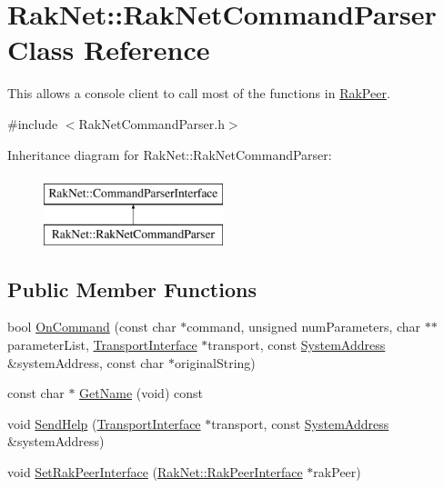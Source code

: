 \hypertarget{class_rak_net_1_1_rak_net_command_parser}{\section{Rak\-Net\-:\-:Rak\-Net\-Command\-Parser Class Reference}
\label{class_rak_net_1_1_rak_net_command_parser}
}


This allows a console client to call most of the functions in \hyperlink{class_rak_net_1_1_rak_peer}{Rak\-Peer}.  




{\ttfamily \#include $<$Rak\-Net\-Command\-Parser.\-h$>$}

Inheritance diagram for Rak\-Net\-:\-:Rak\-Net\-Command\-Parser\-:\begin{figure}[H]
\begin{center}
\leavevmode
\includegraphics[height=2.000000cm]{class_rak_net_1_1_rak_net_command_parser}
\end{center}
\end{figure}
\subsection*{Public Member Functions}
\begin{DoxyCompactItemize}
\item 
bool \hyperlink{class_rak_net_1_1_rak_net_command_parser_a34a1aa5896a8d854cd7fc88675c45533}{On\-Command} (const char $\ast$command, unsigned num\-Parameters, char $\ast$$\ast$parameter\-List, \hyperlink{class_rak_net_1_1_transport_interface}{Transport\-Interface} $\ast$transport, const \hyperlink{struct_rak_net_1_1_system_address}{System\-Address} \&system\-Address, const char $\ast$original\-String)
\item 
const char $\ast$ \hyperlink{class_rak_net_1_1_rak_net_command_parser_ab7529704693ad768ef769f5fe49911cd}{Get\-Name} (void) const 
\item 
void \hyperlink{class_rak_net_1_1_rak_net_command_parser_ad7cff9f3086a6390fd72d4ca2826f271}{Send\-Help} (\hyperlink{class_rak_net_1_1_transport_interface}{Transport\-Interface} $\ast$transport, const \hyperlink{struct_rak_net_1_1_system_address}{System\-Address} \&system\-Address)
\item 
void \hyperlink{class_rak_net_1_1_rak_net_command_parser_ae5364eb9cc511171218089cee5a1c42d}{Set\-Rak\-Peer\-Interface} (\hyperlink{class_rak_net_1_1_rak_peer_interface}{Rak\-Net\-::\-Rak\-Peer\-Interface} $\ast$rak\-Peer)
\end{DoxyCompactItemize}
